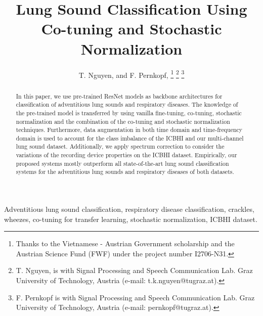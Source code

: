 \documentclass[journal]{IEEEtran}
\begin{document}
\title{Lung Sound Classification Using Co-tuning and Stochastic Normalization}


\author{T. Nguyen, and F. Pernkopf, \thanks{Thanks to the Vietnamese - Austrian Government scholarship and the Austrian Science Fund (FWF) under the 
	project number I2706-N31.}
\thanks{T. Nguyen, is with Signal Processing and Speech Communication Lab.
	Graz University of Technology, Austria (e-mail: t.k.nguyen@tugraz.at).}
\thanks{F. Pernkopf is with Signal Processing and Speech Communication Lab.
Graz University of Technology, Austria (e-mail: pernkopf@tugraz.at).}}



















\maketitle

\begin{abstract}
In this paper, we use pre-trained ResNet models as backbone architectures for classification of adventitious lung sounds and respiratory diseases. The knowledge of the pre-trained model is transferred by using vanilla fine-tuning, co-tuning, stochastic normalization and the combination of the co-tuning and stochastic normalization techniques. Furthermore, data augmentation in both time domain and  time-frequency  domain is used to account for the class imbalance of the ICBHI and our multi-channel lung sound dataset. Additionally, we apply spectrum correction to consider the variations of the recording device properties on the ICBHI dataset. Empirically, our proposed systems mostly outperform all state-of-the-art lung sound classification systems for the adventitious lung sounds and respiratory diseases of both datasets. 
\end{abstract}

\begin{IEEEkeywords}
Adventitious lung sound classification, respiratory disease classification, crackles, wheezes, co-tuning for transfer learning, stochastic normalization, ICBHI dataset.
\end{IEEEkeywords}
\end{document}
